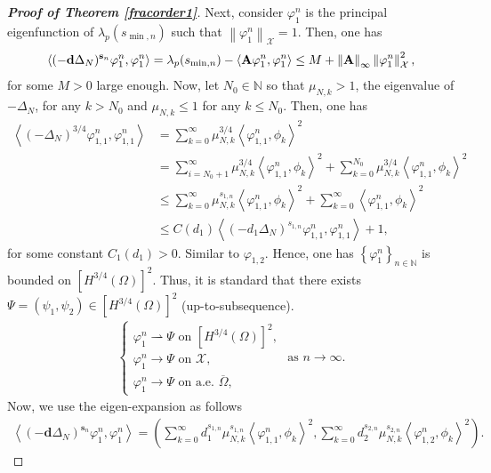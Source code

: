 \documentclass[a4paper,11pt]{amsart}
\theoremstyle{definition}
\def\N{\mathbb{N}}
\def\O{\Omega}
\numberwithin{equation}{section}
\theoremstyle{definition}
\def\O{\Omega}
\begin{document}
\begin{proof}[\bf Proof of Theorem \ref{fracorder1}]
Next, consider $\varphi_1^n$ is the principal eigenfunction of $\lambda_p(s_{\min,n})$ such that $\left\|\varphi_1^n\right\|_{\mathcal{X}}=1$. Then, one has
\begin{align*}
\left<(-\textbf{d}\Delta_N)^{\textbf{s}_n}\varphi_1^n,\varphi_1^n\right> = \lambda_p(s_{\min,n}) - \left<{\bf A}\varphi_1^n,\varphi_1^n\right>\leq M + \left\| {\bf A}\right\|_{\infty} \left\|\varphi_1^n\right\|^2_{\mathcal{X}},
\end{align*}
for some $M>0$ large enough. Now, let $N_0\in \N$ so that $\mu_{N,k}>1$, the eigenvalue of $-\Delta_N$, for any $k>N_0$ and $\mu_{N,k}\leq 1$ for any $k\leq N_0$. Then, one has
\begin{align*}
\left<(-\Delta_N)^{3/4}\varphi_{1,1}^n,\varphi_{1,1}^n\right>&=\sum_{k=0}^{\infty}\mu_{N,k}^{3/4}\left<\varphi_{1,1}^n,\phi_k\right>^2\\
&=\sum_{i=N_0+1}^{\infty}\mu_{N,k}^{3/4}\left<\varphi_{1,1}^n,\phi_k\right>^2+\sum_{k=0}^{N_0}\mu_{N,k}^{3/4}\left<\varphi_{1,1}^n,\phi_k\right>^2\\
&\leq \sum_{k=0}^{\infty}\mu_{N,k}^{s_{1,n}}\left<\varphi_{1,1}^n,\phi_k\right>^2+\sum_{k=0}^{\infty}\left<\varphi_{1,1}^n,\phi_k\right>^2\\
&\leq C(d_1)\left<(-d_1\Delta_N)^{s_{1,n}}\varphi_{1,1}^n,\varphi_{1,1}^n\right>+1,
\end{align*}
for some constant $C_1(d_1)>0$. Similar to $\varphi_{1,2}$. Hence, one has $\left\{\varphi_1^n\right\}_{n\in \N}$ is bounded on $[H^{3/4}(\O)]^2$. 
Thus, it is standard that there exists $\Psi=(\psi_1,\psi_2)\in [H^{3/4}(\O)]^2$ (up-to-subsequence).
\begin{align*}
\left\{\begin{array}{llll}
\varphi^{n}_1	\rightharpoonup \Psi \text{ on }[H^{3/4}(\O)]^2,\\
\varphi^{n}_1	\rightarrow \Psi \text{ on }\mathcal{X},\\
\varphi^{n}_1	\rightarrow \Psi\text{ on a.e. }\overline{\O},
\end{array}
\right. \text{ as }n\rightarrow \infty.
\end{align*} 
Now, we use the eigen-expansion as follows
\begin{align*}
\left<(-\textbf{d}\Delta_N)^{\textbf{s}_n}\varphi_1^n,\varphi_1^n\right>=\left(\sum_{k=0}^\infty d_1^{s_{1,n}}\mu_{N,k}^{s_{1,n}}\left<\varphi_{1,1}^n,\phi_k\right>^2,\sum_{k=0}^\infty d_2^{s_{2,n}}\mu_{N,k}^{s_{2,n}}\left<\varphi_{1,2}^n,\phi_k\right>^2 \right).

\end{align*}
\end{proof}
\end{document}
